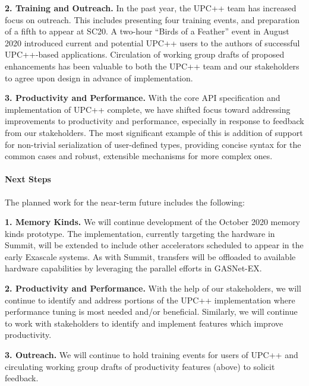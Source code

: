 \textbf{2. Training and Outreach.}
In the past year, the UPC++ team has increased focus on outreach.  This includes
presenting four training events, and preparation of a fifth to appear at SC20.
A two-hour ``Birds of a Feather'' event in August 2020 introduced current and
potential UPC++ users to the authors of successful UPC++-based applications.
Circulation of working group drafts of proposed enhancements has
been valuable to both the UPC++ team and our stakeholders to agree upon design
in advance of implementation.

\textbf{3. Productivity and Performance.}
With the core API specification and implementation of UPC++ complete, we have
shifted focus toward addressing improvements to productivity and performance,
especially in response to feedback from our stakeholders.  The most significant
example of this is addition of support for non-trivial serialization of
user-defined types, providing concise syntax for the common cases and
robust, extensible mechanisms for more complex ones.

\paragraph{Next Steps}

The planned work for the near-term future includes the following:

\textbf{1. Memory Kinds.}
We will continue development of the October 2020 memory kinds prototype.  The
implementation, currently targeting the hardware in Summit, will be extended to
include other accelerators scheduled to appear in the early Exascale systems.
As with Summit, transfers will be offloaded to available hardware capabilities
by leveraging the parallel efforts in GASNet-EX.

\textbf{2. Productivity and Performance.}
With the help of our stakeholders, we will continue to identify and address
portions of the UPC++ implementation where performance tuning is most needed
and/or beneficial.  Similarly, we will continue to work with stakeholders to
identify and implement features which improve productivity.

\textbf{3. Outreach.}
We will continue to hold training events for users of UPC++ and circulating
working group drafts of productivity features (above) to solicit feedback.
